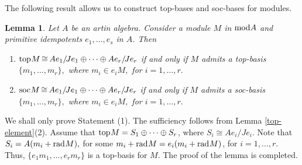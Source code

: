 \documentclass[10pt]{amsart}
\newtheorem{Lemma}[Theo]{Lemma}
\theoremstyle{definition}
\newcommand{\mmod}{{\rm mod}}
\newcommand{\rad}{{\rm rad}\hspace{.5pt}}
\newcommand{\soc}{{\rm soc}\hspace{.5pt}}
\newcommand{\ntop}{{\rm top}\hspace{.5pt}}
\begin{document}
\smallskip

The following result allows us to construct top-bases and soc-bases for modules.

\begin{Lemma}\label{find_top-basis} Let $A$ be an artin algebra. Consider a module $M$ in $\mmod A$ and primitive idempotents $e_1, \ldots, e_s$ in $A$. Then 

\begin{enumerate}[$(1)$]

\vspace{-2.5pt}

\item $\ntop M \hspace{-1pt} \cong \hspace{-1pt} Ae_1  / \hspace{-1.5pt} Je_1 \oplus \cdots \oplus  Ae_r  / \hspace{-1.5pt} Je_r$ if and only if $M$ admits a top-basis $\{m_1, \ldots, m_r\},$ where $m_i\in e_iM,$ for $i=1, \ldots, r.$

\item $\soc M \hspace{-1pt} \cong \hspace{-1pt} Ae_1  / \hspace{-1.5pt} Je_1 \oplus \cdots \oplus  Ae_r  / \hspace{-1.5pt} Je_r$ if and only if $M$ admits a soc-basis $\{m_1, \ldots, m_r\},$ where $m_i\in e_iM,$ for $i=1, \ldots, r.$

\end{enumerate} \end{Lemma}

 We shall only prove Statement (1). The sufficiency follows from Lemma  \ref{top-element}(2). Assume that $\ntop M = S_1 \oplus \cdots \oplus S_r$, where $S_i\cong Ae_i/Je_i.$ Note that 
$S_i=A(m_i+\rad M),$ for some $m_i+\rad M=e_i(m_i+\rad M)$, for $i=1, \ldots, r.$ Thus, $\{e_1m_1, \ldots, e_rm_r\}$ is a top-basis for $M.$
The proof of the lemma is completed.
\end{document}
